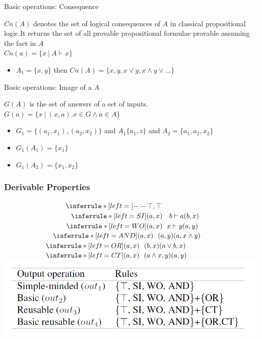 \documentclass[9pt]{beamer}
\begin{document}
\begin{frame}{Basic operations: Consequence}
\begin{definition}[Consequence Cn(A)]
	$Cn(A)$ denotes the set of logical consequences of $A$ in classical propositional logic.It returns the set of all provable propositional formulae provable assuming the fact in $A$\\
	$Cn(a)=\{x~|~A\vdash x \}$
\end{definition}
\begin{example}
	\begin{itemize}
\item $A_1= \{x,y\}$ then $Cn(A)= \{x, y, x \vee y, x \wedge y \vee \dots \}$
\end{itemize}
\end{example}
\end{frame}

\begin{frame}{Basic operations: Image of a $A$}
\begin{definition}[G(A)]
	$G(A)$ is the set of answers of a set of inputs.\\
	$G(a)=\{x~|~(x,a). x \in G \wedge a \in A  \}$
\end{definition}
\begin{example}
	\begin{itemize}
		\item $G_1=\{(a_1,x_1),(a_2,x_2)\} $ and $A_1\{a_1,z\} $ and $A_2=\{a_1,a_2,x_2\}$
		\item $G_1(A_1)= \{x_1\}$
		\item $G_1(A_2)= \{x_1,x_2\}$
	\end{itemize}
\end{example}
\end{frame}






\begin{frame}
\frametitle{Derivable Properties }

	
	$ ~~~~~~~~~~~~~~~~~~~~~~~~~~\inferrule*[left=$\top$]{--}{\top,\top}$
	$~~~~~~~~~~~~~~~~~~~~~~~~~~~~\inferrule*[left=SI]
	{(a,x)~~~b \vdash a}{(b,x)}$ \\
	$ ~~~~~~~~~~~~~~~~~~~~~~~~~~\inferrule*[left=WO]{(a,x) ~~ x\vdash y}{(a,y)}$
	$ ~~~~~~~~~~~~~~~~~~~~\inferrule*[left=AND]{(a,x) ~~ (a,y)}{(a,x\wedge y)}$\\
	$ ~~~~~~~~~~~~~~~~~\inferrule*[left=OR]{(a,x) ~~ (b,x)}{(a\vee b,x)}$
	$ ~~~~~~~~~~~~~~~~~\inferrule*[left=CT]{(a,x) ~~ (a\wedge x,y)}{(a,y)}$
\pause
\centering
\includegraphics[scale=0.30]{out.png}
\end{frame}
\end{document}
